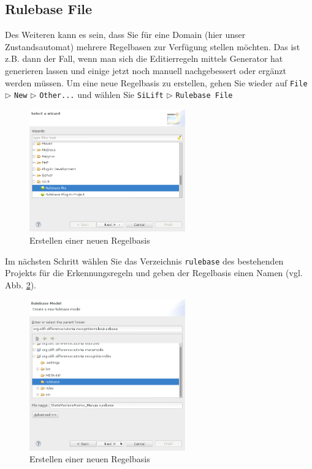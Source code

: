 \subsection{Rulebase File}
\label{sec:rbfile}

Des Weiteren kann es sein, dass Sie für eine Domain (hier unser Zustandsautomat) mehrere Regelbasen zur Verfügung stellen möchten.
Das ist z.B. dann der Fall, wenn man sich die Editierregeln mittels Generator hat generieren lassen und einige jetzt noch manuell nachgebessert oder ergänzt werden müssen.
Um eine neue Regelbasis zu erstellen, gehen Sie wieder auf \texttt{File} $\triangleright$ \texttt{New} $\triangleright$ \texttt{Other...} und wählen Sie  \texttt{SiLift} $\triangleright$ \texttt{Rulebase File}

\begin{figure}[H]
\centering
\includegraphics[width=0.6\textwidth]{recognitionrules/graphics/silift-wizard_rulebase_file_page01.png}
\caption{Erstellen einer neuen Regelbasis}
\label{silift-wizard_rulebase_file_page01}
\end{figure}

Im nächsten Schritt wählen Sie das Verzeichnis \texttt{rulebase} des bestehenden Projekts für die Erkennungsregeln und geben der Regelbasis einen Namen (vgl. Abb. \ref{silift-wizard_rulebase_file_page02}).

\begin{figure}[H]
\centering
\includegraphics[width=0.6\textwidth]{recognitionrules/graphics/silift-wizard_rulebase_file_page02.png}
\caption{Erstellen einer neuen Regelbasis}
\label{silift-wizard_rulebase_file_page02}
\end{figure}

